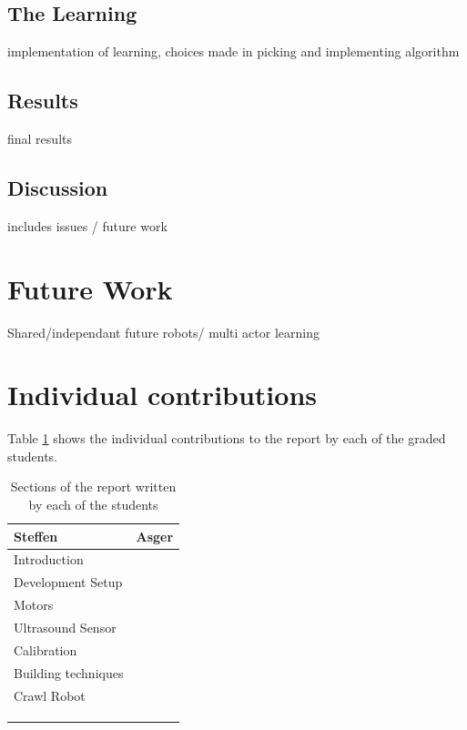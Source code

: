 \documentclass[11pt, a4paper]{article}
\begin{document}
\subsection{The Learning}
implementation of learning, choices made in picking and implementing algorithm
\subsection{Results}
final results
\subsection{Discussion}
includes issues / future work

\section{Future Work}
Shared/independant
future robots/  multi actor learning

\section{Individual contributions}
Table \ref{tab:contributions} shows the individual contributions to the report by each of the graded students.
\begin{table}[H]
	\centering
	\begin{tabular}{l|l}
		Steffen & Asger \\ \hline
		Introduction &       \\
		Development Setup & \\
		Motors & \\
		Ultrasound Sensor & \\
		Calibration & \\
		Building techniques & \\
        Crawl Robot & \\
	     & \\
	     & \\
	     & \\
     
		      
	\end{tabular}
	\caption{Sections of the report written by each of the students}
	\label{tab:contributions}
\end{table}




\end{document}
